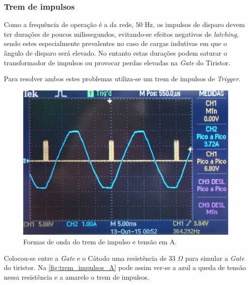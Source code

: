 \documentclass[a4paper,11pt]{article}
\numberwithin{equation}{section}
\begin{document}
\subsubsection{Trem de impulsos}

Como a frequência de operação é a da rede, $50$ Hz, os impulsos de disparo devem ter durações de poucos milissegundos, evitando-se efeitos negativos de \textit{latching}, sendo estes especialmente prevalentes no caso de cargas indutivas em que o ângulo de disparo será elevado. No entanto estas durações podem saturar o transformador de impulsos ou provocar perdas elevadas na \textit{Gate} do Tiristor.

Para resolver ambos estes problemas utiliza-se um trem de impulsos de \textit{Trigger}.

\begin{figure}[h]
	\centering
	\includegraphics[keepaspectratio=true, scale=0.115]{img/figs/trem_impulsos_A}
	\caption{Formas de onda do trem de impulso e tensão em A.}
	\label{fig:trem_impulsos_A}
	\vspace{-0.8em}
\end{figure}

Colocou-se entre a \textit{Gate} e o Cátodo uma resistência de $33$ $\Omega$ para simular a \textit{Gate} do tiristor. Na \autoref{fig:trem_impulsos_A} pode assim ver-se a azul a queda de tensão nessa resistência e a amarelo o trem de impulsos.
\end{document}
